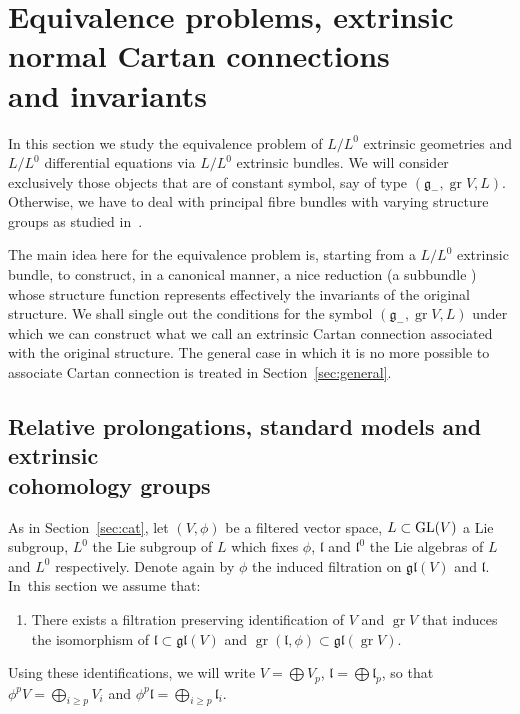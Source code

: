 \documentclass[10pt,a4paper]{amsart}
\newcommand{\g}{\mathfrak g}
\newcommand{\gl}{\mathfrak{gl}}
\newcommand{\lf}{\mathfrak l}
\newcommand{\gr}{\operatorname{gr}}
\numberwithin{equation}{section}
\begin{document}
\section[Equivalence problems, extrinsic normal Cartan connections and invariants]
{Equivalence problems, extrinsic normal Cartan connections\\ and invariants}\label{sec5}

In this section we study the equivalence problem of $L/L^0$ extrinsic geometries and $L/L^0$ dif\-fe\-ren\-tial equations via $L/L^0$ extrinsic bundles. We will consider exclusively those objects that are of constant symbol, say of type $(\g_- , \gr V, L)$. Otherwise, we have to deal with principal fibre bundles with varying structure groups as studied in~\cite{Mor1983}.

The main idea here for the equivalence problem is, starting from a $L/L^0$ extrinsic bundle, to construct, in a canonical manner,
a nice reduction (a subbundle ) whose structure function represents effectively the invariants of the original structure. We shall single out the conditions for the symbol $(\g_-, \gr V, L)$ under which we can construct what we call an extrinsic Cartan connection associated with the original structure. The general case in which it is no more possible to associate Cartan connection is treated in Section~\ref{sec:general}.


\subsection[Relative prolongations, standard models and extrinsic cohomology groups]
{Relative prolongations, standard models and extrinsic \\cohomology groups}

As in Section~\ref{sec:cat}, let $(V, \phi)$ be a filtered vector space,
$L \subset {\rm GL}(V) $ a Lie subgroup, $L^0$ the Lie subgroup of $L$
which fixes $\phi$, $\lf$ and $\lf^0$ the Lie algebras of $L$ and $L^0$
respectively. Denote again by $\phi$ the induced filtration on
$\mathfrak{gl}(V)$ and $\lf$. In~this section we assume that:

\begin{enumerate}\itemsep=0pt
	\item[(C0)]
	There exists a filtration preserving identification of $V$ and $\gr V$ that induces the isomorphism of $\lf\subset \gl(V)$ and $\gr(\lf, \phi)\subset \gl(\gr V)$.
\end{enumerate}

Using these identifications, we will write $V = \bigoplus V_p$, $\lf = \bigoplus \lf_p$, so that $\phi^pV = \bigoplus _{ i \ge p} V_i$ and $\phi^p\lf = \bigoplus _{ i \ge p} \lf_i$.
\end{document}
